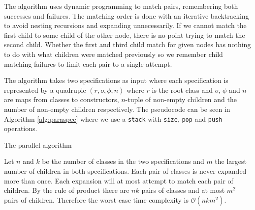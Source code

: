 The algorithm uses dynamic programming to match pairs, remembering both successes and failures. The matching order is done with an iterative backtracking to avoid nesting recursions and expanding unnecessarily. If we cannot match the first child to some child of the other node, there is no point trying to match the second child. Whether the first and third child match for given nodes has nothing to do with what children were matched previously so we remember child matching failures to limit each pair to a single attempt.

The algorithm takes two specifications as input where each specification is represented by a quadruple $(r,o,\phi,n)$ where $r$ is the root class and $o$, $\phi$ and $n$ are maps from classes to constructors, $n$-tuple of non-empty children and the number of non-empty children respectively. The pseudocode can be seen in Algorithm \ref{alg:paraspec} where we use a \texttt{stack} with \texttt{size}, \texttt{pop} and \texttt{push} operations. 

\begin{algorithm}

\caption{The parallel algorithm}
\label{alg:paraspec}
\end{algorithm}

Let $n$ and $k$ be the number of classes in the two specifications and $m$ the largest number of children in both specifications. Each pair of classes is never expanded more than once. Each expansion will at most attempt to match each pair of children. By the rule of product there are $nk$ pairs of classes and at most $m^2$ pairs of children. Therefore the worst case time complexity is $\mathcal{O}(nkm^2)$.